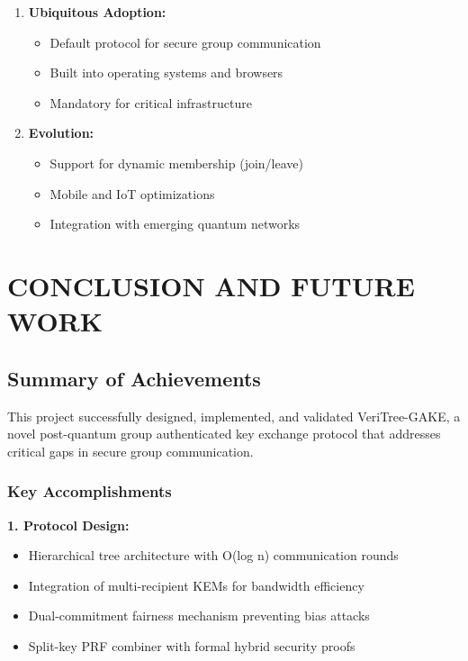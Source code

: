 \documentclass[12pt,a4paper]{report}
\begin{document}
\begin{enumerate}
\item \textbf{Ubiquitous Adoption:}
\begin{itemize}
\item Default protocol for secure group communication
\item Built into operating systems and browsers
\item Mandatory for critical infrastructure
\end{itemize}

\item \textbf{Evolution:}
\begin{itemize}
\item Support for dynamic membership (join/leave)
\item Mobile and IoT optimizations
\item Integration with emerging quantum networks
\end{itemize}
\end{enumerate}


\chapter{CONCLUSION AND FUTURE WORK}

\section{Summary of Achievements}

This project successfully designed, implemented, and validated VeriTree-GAKE, a novel post-quantum group authenticated key exchange protocol that addresses critical gaps in secure group communication.

\subsection{Key Accomplishments}

\textbf{1. Protocol Design:}
\begin{itemize}
\item Hierarchical tree architecture with O(log n) communication rounds
\item Integration of multi-recipient KEMs for bandwidth efficiency
\item Dual-commitment fairness mechanism preventing bias attacks
\item Split-key PRF combiner with formal hybrid security proofs
\end{itemize}
\end{document}
